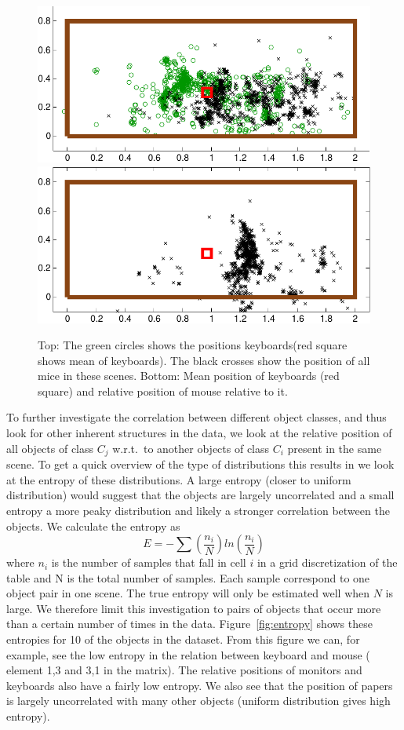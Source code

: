 \documentclass[letterpaper, 10 pt, conference]{ieeeconf}  %
\begin{document}
\begin{figure}
\begin{center}
\includegraphics[width=0.8\linewidth]{keyboard_mouse_raw-crop}
\includegraphics[width=0.8\linewidth]{keyboard_mouse-crop}
\end{center}
\caption{Top: The green circles shows the positions keyboards(red square shows mean of keyboards). The black crosses show the position of all mice in these scenes. Bottom: Mean position of keyboards (red square) and relative position of mouse relative to it.} 
\label{fig:scatter-keyboard-mouse}
\end{figure}

To further investigate the correlation between different object classes, and thus look for other inherent structures in the data, we look at 
the relative position of all objects of class $C_j$ w.r.t.\ to another objects of class $C_i$ present in the same scene. To get a quick 
overview of the type of distributions this results in we look at the entropy of these distributions. A large entropy (closer to uniform 
distribution) would suggest that the objects are largely uncorrelated and a small entropy a more peaky distribution and likely a stronger 
correlation between the objects. We calculate the entropy as 
\begin{equation}
E=-\sum (\frac{n_i}{N})ln(\frac{n_i}{N})
\end{equation}
where $n_i$ is the number of samples that fall in cell $i$ in a grid discretization of the table and N is the total number of samples. Each 
sample correspond to one object pair in one scene. The true entropy will only be estimated well when $N$ is large. We therefore limit this 
investigation to pairs of objects that occur more than a certain number of times in the data. Figure~\ref{fig:entropy} shows these entropies 
for 10 of the objects in the dataset. From this figure we can, for example, see the low entropy in the relation between keyboard and mouse (
element 1,3 and 3,1 in the matrix). The relative positions of monitors and keyboards also have a fairly low entropy. We also see that the 
position of papers is largely uncorrelated with many other objects (uniform distribution gives high entropy). 
\end{document}
